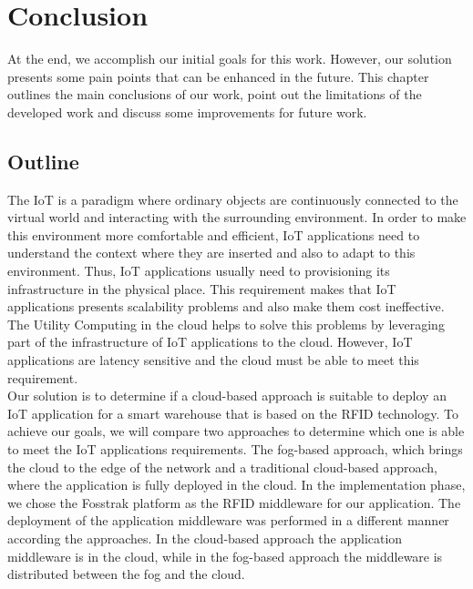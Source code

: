 
\chapter{Conclusion}
\label{chapter:conclusion}
At the end, we accomplish our initial goals for this work. However, our solution presents some pain
points that can be enhanced in the future. This chapter outlines the main conclusions of our work,
point out the limitations of the developed work and discuss some improvements for future work.

\section{Outline}
\label{sec:outline}
The \acrfull{IoT} is a paradigm where ordinary objects are continuously connected to the virtual
world and interacting with the surrounding environment. In order to make this environment more comfortable and
efficient, \gls{IoT} applications need to understand the context where they are inserted and also to
adapt to this environment. Thus, \gls{IoT} applications usually need to provisioning its infrastructure
in the physical place. This requirement makes that \gls{IoT} applications presents scalability
problems and also make them cost ineffective. The Utility Computing in the cloud helps to solve this
problems by leveraging part of the infrastructure of \gls{IoT} applications to the cloud. However,
\gls{IoT} applications are latency sensitive and the cloud must be able to meet this requirement.\\

Our solution is to determine if a cloud-based approach is suitable to deploy an \gls{IoT} application
for a smart warehouse that is based on the \gls{RFID} technology. To achieve our goals, we will
compare two approaches to determine which one is able to meet the \gls{IoT} applications requirements.
The fog-based approach, which brings the cloud to the edge of the network and a traditional cloud-based
approach, where the application is fully deployed in the cloud. In the implementation phase, we chose
the Fosstrak platform as the \gls{RFID} middleware for our application. The deployment of the
application middleware was performed in a different manner according the approaches. In the cloud-based
approach the application middleware is in the cloud, while in the fog-based approach the middleware
is distributed between the fog and the cloud.\\

